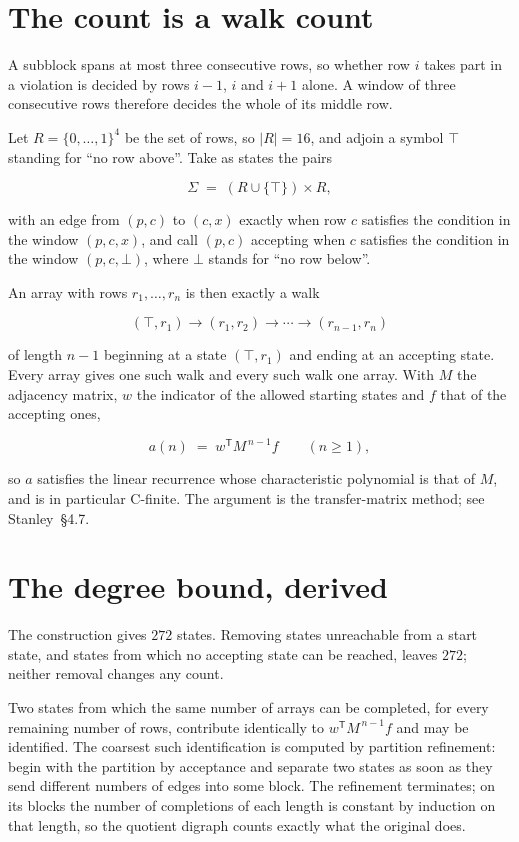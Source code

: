 \documentclass[11pt]{article}
\theoremstyle{definition}
\begin{document}
\section{The count is a walk count}

A subblock spans at most three consecutive rows, so whether row $i$ takes part in a violation is decided by rows $i-1$, $i$ and $i+1$ alone. A window of three consecutive rows therefore decides the whole of its middle row.

Let $R = \{0,\dots,1\}^{4}$ be the set of rows, so $|R| = 16$, and adjoin a symbol $\top$ standing for ``no row above''. Take as states the pairs

\[\Sigma \;=\; (R \cup \{\top\}) \times R,\]

with an edge from $(p,c)$ to $(c,x)$ exactly when row $c$ satisfies the condition in the window $(p,c,x)$, and call $(p,c)$ accepting when $c$ satisfies the condition in the window $(p,c,\bot)$, where $\bot$ stands for ``no row below''.

An array with rows $r_1,\dots,r_n$ is then exactly a walk

\[(\top,r_1) \to (r_1,r_2) \to \cdots \to (r_{n-1},r_n)\]

of length $n-1$ beginning at a state $(\top,r_1)$ and ending at an accepting state. Every array gives one such walk and every such walk one array. With $M$ the adjacency matrix, $w$ the indicator of the allowed starting states and $f$ that of the accepting ones,

\[a(n) \;=\; w^{\mathsf T} M^{\,n-1} f \qquad (n \ge 1),\]

so $a$ satisfies the linear recurrence whose characteristic polynomial is that of $M$, and is in particular C-finite. The argument is the transfer-matrix method; see Stanley~\S4.7.

\section{The degree bound, derived}

The construction gives $272$ states. Removing states unreachable from a start state, and states from which no accepting state can be reached, leaves $272$; neither removal changes any count.

Two states from which the same number of arrays can be completed, for every remaining number of rows, contribute identically to $w^{\mathsf T}M^{\,n-1}f$ and may be identified. The coarsest such identification is computed by partition refinement: begin with the partition by acceptance and separate two states as soon as they send different numbers of edges into some block. The refinement terminates; on its blocks the number of completions of each length is constant by induction on that length, so the quotient digraph counts exactly what the original does.
\end{document}
